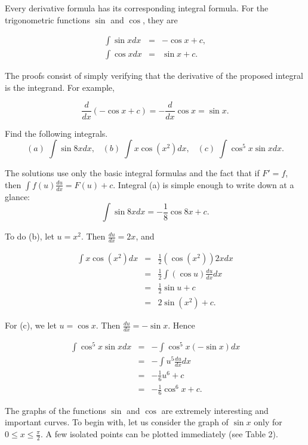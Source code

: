 Every derivative formula has its corresponding integral formula. For the trigonometric
functions $\sin$ and $\cos$, they are

\begin{theorem} %
\begin{eqnarray*}
 \int \sin x dx &=& -\cos x + c,  \\
\int \cos x dx &=& \sin x + c. 
\end{eqnarray*}
\end{theorem}

The proofs consist of simply verifying that the derivative of the proposed integral is the integrand. For example, 

$$
\frac{d}{dx} (-\cos x + c) = - \frac{d}{dx} \cos x = \sin x.
$$

\begin{example} Find the following integrals.
$$
(a)\; \int \sin 8x dx, \;\;\;(b)\; \int x \cos(x^2) dx, \;\;\;(c)\; \int \cos^{5}x \sin x dx.
$$

The solutions use only the basic integral formulas and the fact that if $F' = f$, then $\int f(u) \frac{du}{dx} = F(u) + c$. Integral (a) is simple enough to write down at a glance:
$$
\int \sin 8x dx = - \frac{1}{8} \cos 8x + c.
$$


To do (b), let $u = x^2$. Then $\frac{du}{dx} = 2x$, and

\begin{eqnarray*}
\int x \cos(x^2) dx &=& \frac{1}{2}(\cos(x^2))2x dx \\
                             &=& \frac{1}{2} \int (\cos u) \frac{du}{dx}dx \\
                             &=& \frac{1}{2} \sin u + c \\
                             &=& 2 \sin (x^2) + c.
\end{eqnarray*}

For (c), we let $u = \cos x$. Then $\frac{du}{dx} = -\sin x$. Hence 

\begin{eqnarray*}
\int \cos^{5} x \sin x dx &=& - \int \cos^{5} x (- \sin x) dx  \\
&=& - \int u^{5} \frac{du}{dx} dx \\
&=& - \frac{1}{6} u^{6} + c \\
&=& - \frac{1}{6} \cos^{6} x + c.
\end{eqnarray*}
\end{example}

The graphs of the functions $\sin$ and $\cos$ are extremely interesting and important curves. 
To begin with, let us consider the graph of $\sin x$ only for $0 \leq x \leq \frac{\pi}{2}$.  A few isolated points can be plotted immediately (see Table 2).
\medskip

